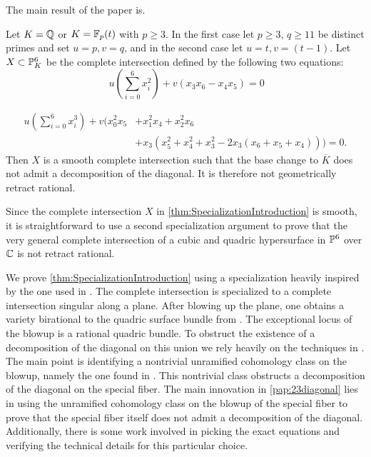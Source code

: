 The main result of the paper is.
\begin{theorem}
	\label{thm:SpecializationIntroduction}
	Let $K=\Q$ or $K=\F_p(t)$ with $p \geq 3$. In the first case let $p \geq 3$, $q \geq 11$ be distinct primes and set $u=p,v=q$, and in the second case let $u=t,v=(t-1)$. Let $X \subset \P^6_K$ be the complete intersection defined by the following two equations:
	\begin{equation}
		\ u \left(\sum_{i=0}^6 x_i^2 \right) + v(x_3x_6-x_4x_5)=0
	\end{equation}
	
	\begin{align}
		u \left(\sum_{i=0}^6 x_i^3 \right) + v(x_0^2x_5 &+ x_1^2x_4 + x_2^2x_6 \nonumber \\
		 &+ x_3(x_5^2+x_4^2+x_3^2 -2x_3(x_6 + x_5 + x_4)))=0.
	\end{align}
	Then $X$ is a smooth complete intersection such that the base change to $\overline{K}$ does not admit a decomposition of the diagonal. It is therefore not geometrically retract rational.
\end{theorem}
\begin{remark}
	Since the complete intersection $X$ in \cref{thm:SpecializationIntroduction} is smooth, it is straightforward to use a second specialization argument to prove that the very general complete intersection of a cubic and quadric hypersurface in $\P^6$ over $\C$ is not retract rational.
\end{remark}
We prove \cref{thm:SpecializationIntroduction} using a specialization heavily inspired by the one used in \cite{NicaiseOttem}. The complete intersection is specialized to a complete intersection singular along a plane. After blowing up the plane, one obtains a variety birational to the quadric surface bundle from \cite{HPTActa}. The exceptional locus of the blowup is a rational quadric bundle. To obstruct the existence of a decomposition of the diagonal on this union we rely heavily on the techniques in \cite{SchreiederHypersurface}. The main point is identifying a nontrivial unramified cohomology class on the blowup, namely the one found in \cite{HPTActa}. This nontrivial class obstructs a decomposition of the diagonal on the special fiber. The main innovation in \cref{pap:23diagonal} lies in using the unramified cohomology class on the blowup of the special fiber to prove that the special fiber itself does not admit a decomposition of the diagonal. Additionally, there is some work involved in picking the exact equations and verifying the technical details for this particular choice.

